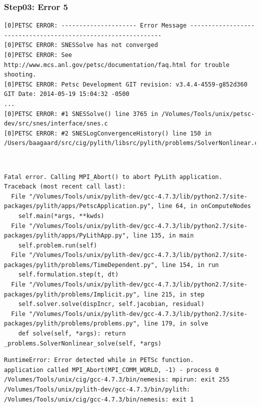 \documentclass{beamer}
\begin{document}
\begin{frame}[fragile]
  \frametitle{Step03: Error 5}

\begin{lstlisting}
[0]PETSC ERROR: --------------------- Error Message --------------------------------------------------------------
[0]PETSC ERROR: SNESSolve has not converged
[0]PETSC ERROR: See http://www.mcs.anl.gov/petsc/documentation/faq.html for trouble shooting.
[0]PETSC ERROR: Petsc Development GIT revision: v3.4.4-4559-g852d360  GIT Date: 2014-05-19 15:04:32 -0500
...
[0]PETSC ERROR: #1 SNESSolve() line 3765 in /Volumes/Tools/unix/petsc-dev/src/snes/interface/snes.c
[0]PETSC ERROR: #2 SNESLogConvergenceHistory() line 150 in /Users/baagaard/src/cig/pylith/libsrc/pylith/problems/SolverNonlinear.cc
\end{lstlisting}
\\

\begin{lstlisting}
Fatal error. Calling MPI_Abort() to abort PyLith application.
Traceback (most recent call last):
  File "/Volumes/Tools/unix/pylith-dev/gcc-4.7.3/lib/python2.7/site-packages/pylith/apps/PetscApplication.py", line 64, in onComputeNodes
    self.main(*args, **kwds)
  File "/Volumes/Tools/unix/pylith-dev/gcc-4.7.3/lib/python2.7/site-packages/pylith/apps/PyLithApp.py", line 135, in main
    self.problem.run(self)
  File "/Volumes/Tools/unix/pylith-dev/gcc-4.7.3/lib/python2.7/site-packages/pylith/problems/TimeDependent.py", line 154, in run
    self.formulation.step(t, dt)
  File "/Volumes/Tools/unix/pylith-dev/gcc-4.7.3/lib/python2.7/site-packages/pylith/problems/Implicit.py", line 215, in step
    self.solver.solve(dispIncr, self.jacobian, residual)
  File "/Volumes/Tools/unix/pylith-dev/gcc-4.7.3/lib/python2.7/site-packages/pylith/problems/problems.py", line 179, in solve
    def solve(self, *args): return _problems.SolverNonlinear_solve(self, *args)
\end{lstlisting}
\begin{lstlisting}
RuntimeError: Error detected while in PETSc function.
application called MPI_Abort(MPI_COMM_WORLD, -1) - process 0
/Volumes/Tools/unix/cig/gcc-4.7.3/bin/nemesis: mpirun: exit 255
/Volumes/Tools/unix/pylith-dev/gcc-4.7.3/bin/pylith: /Volumes/Tools/unix/cig/gcc-4.7.3/bin/nemesis: exit 1
\end{lstlisting}

\end{frame}
\end{document}
